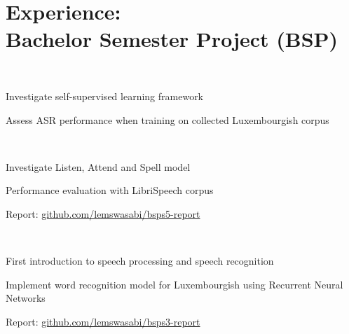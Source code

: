 \documentclass[]{curriculumvitae}
\begin{document}
\begin{minipage}[t]{0.65\textwidth}

\section{Experience:\\ Bachelor Semester Project (BSP)}

\\
\vspace{0.9em}
\begin{tightemize}
	\item Investigate self-supervised learning framework
	\item Assess ASR performance when training on collected Luxembourgish corpus
\end{tightemize}
\sectionsep

\\
\vspace{0.9em}
\begin{tightemize}
	\item Investigate Listen, Attend and Spell model
	\item Performance evaluation with LibriSpeech corpus
	\item \faPaper \hspace{0.2em} Report: \href{https://github.com/lemswasabi/bsps5-report}{github.com/lemswasabi/bsps5-report}
\end{tightemize}
\sectionsep

\\
\vspace{0.9em}
\begin{tightemize}
	\item First introduction to speech processing and speech recognition
	\item Implement word recognition model for Luxembourgish using Recurrent Neural Networks
	\item \faPaper \hspace{0.2em} Report: \href{https://github.com/lemswasabi/bsps3-report}{github.com/lemswasabi/bsps3-report}
\end{tightemize}
\sectionsep


\end{minipage}
\end{document}
